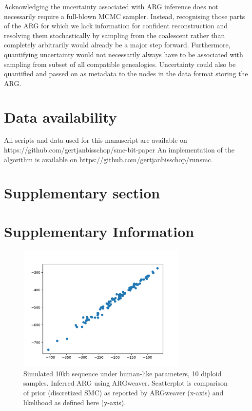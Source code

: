 \documentclass{article}
\newcommand{\supplementarysection}{%
  \setcounter{figure}{0}%
  \let\oldthefigure\thefigure%
  \renewcommand{\thefigure}{S\oldthefigure}%
  \section{Supplementary section}%
}
\begin{document}
Acknowledging the uncertainty associated with ARG inference does not
necessarily require a full-blown MCMC sampler. Instead, recognising those parts of
the ARG for which we lack information for confident reconstruction and resolving
them stochastically by sampling from the coalescent rather than completely arbitrarily
would already be a major step forward.
Furthermore, quantifying uncertainty would not necessarily always have to be associated
with sampling from subset of all compatible genealogies. Uncertainty could also
be quantified and passed on as metadata to the nodes in the data format storing the ARG.



\section{Data availability}

All scripts and data used for this manuscript are available on https://github.com/gertjanbisschop/smc-bit-paper
An implementation of the algorithm is available on https://github.com/gertjanbisschop/runsmc.
\FloatBarrier



\pagebreak

\supplementarysection
\section*{Supplementary Information}


\begin{figure}[!ht]
\centering
\includegraphics[width=0.75\textwidth]{figures/supplementary-figs/argweaver_vs_runsmc.png}
\caption{Simulated 10kb sequence under human-like parameters, 10 diploid samples. Inferred ARG using ARGweaver. Scatterplot is comparison of prior (discretized SMC) as reported by ARGweaver (x-axis) and likelihood as defined here (y-axis).}
 \label{sup:fig:vs-argweaver}
\end{figure}
\end{document}
